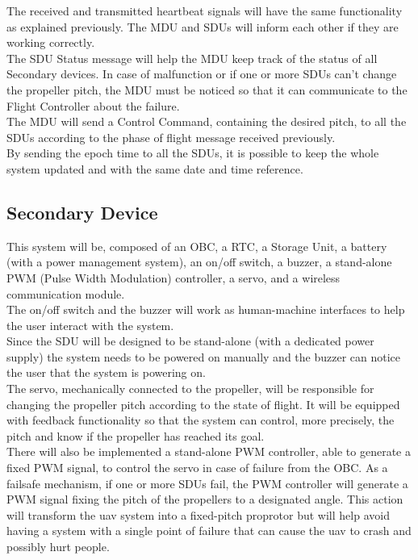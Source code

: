The received and transmitted heartbeat signals will have the same functionality as explained previously. The MDU and SDUs will inform each other if they are working correctly.\\

The SDU Status message will help the MDU keep track of the status of all Secondary devices. In case of malfunction or if one or more SDUs can't change the propeller pitch, the MDU must be noticed so that it can communicate to the Flight Controller about the failure.\\

The MDU will send a Control Command, containing the desired pitch, to all the SDUs according to the phase of flight message received previously.\\

By sending the epoch time to all the SDUs, it is possible to keep the whole system updated and with the same date and time reference.\\

\subsection{Secondary Device}
This system will be, composed of an \gls{OBC}, a \gls{RTC}, a Storage Unit, a battery (with a power management system), an on/off switch, a buzzer, a stand-alone \gls{PWM} (Pulse Width Modulation) controller, a servo, and a wireless communication module.\\

The on/off switch and the buzzer will work as human-machine interfaces to help the user interact with the system.\\
Since the SDU will be designed to be stand-alone (with a dedicated power supply) the system needs to be powered on manually and the buzzer can notice the user that the system is powering on.\\

The servo, mechanically connected to the propeller, will be responsible for changing the propeller pitch according to the state of flight.
It will be equipped with feedback functionality so that the system can control, more precisely, the pitch and know if the propeller has reached its goal.\\

There will also be implemented a stand-alone \gls{PWM} controller, able to generate a fixed \gls{PWM} signal, to control the servo in case of failure from the \gls{OBC}.
As a failsafe mechanism, if one or more SDUs fail, the \gls{PWM} controller will generate a \gls{PWM} signal fixing the pitch of the propellers to a designated angle.
This action will transform the \gls{uav} system into a fixed-pitch proprotor but will help avoid having a system with a single point of failure that can cause the \gls{uav} to crash and possibly hurt people.\\
